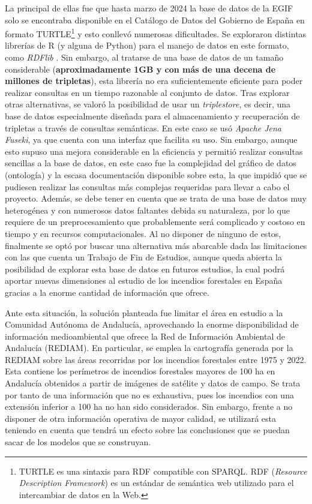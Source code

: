 \documentclass[12pt,a4paper,]{book}
\let\rmarkdownfootnote\footnote%
\def\footnote{\protect\rmarkdownfootnote}
\numberwithin{dummy}{section}
\theoremstyle{ocrenumbox}
\theoremstyle{blacknumex}
\theoremstyle{blacknumbox}
\theoremstyle{ocrenum}
\theoremstyle{ocrenum}
\begin{document}
La principal de ellas fue que hasta marzo de 2024 la base de datos de la
EGIF solo se encontraba disponible en el Catálogo de Datos del Gobierno
de España en formato TURTLE\footnote{TURTLE es una sintaxis para RDF
  compatible con SPARQL. RDF (\emph{Resource Description Framework}) es
  un estándar de semántica web utilizado para el intercambiar de datos
  en la Web.} y esto conllevó numerosas dificultades. Se exploraron
distintas librerías de R (y alguna de Python) para el manejo de datos en
este formato, como \emph{RDFlib} \citep{rdflib}. Sin embargo, al
tratarse de una base de datos de un tamaño considerable
(\textbf{aproximadamente 1GB y con más de una decena de millones de
tripletas}), esta librería no era suficientemente eficiente para poder
realizar consultas en un tiempo razonable al conjunto de datos. Tras
explorar otras alternativas, se valoró la posibilidad de usar un
\emph{triplestore}, es decir, una base de datos especialmente diseñada
para el almacenamiento y recuperación de tripletas a través de consultas
semánticas. En este caso se usó \emph{Apache Jena Fuseki}, ya que cuenta
con una interfaz que facilita su uso. Sin embargo, aunque esto supuso
una mejora considerable en la eficiencia y permitió realizar consultas
sencillas a la base de datos, en este caso fue la complejidad del
gráfico de datos (ontología) y la escasa documentación disponible sobre
esta, la que impidió que se pudiesen realizar las consultas más
complejas requeridas para llevar a cabo el proyecto. Además, se debe
tener en cuenta que se trata de una base de datos muy heterogénea y con
numerosos datos faltantes debida su naturaleza, por lo que requiere de
un preprocesamiento que probablemente será complicado y costoso en
tiempo y en recursos computacionales. Al no disponer de ninguno de
estos, finalmente se optó por buscar una alternativa más abarcable dada
las limitaciones con las que cuenta un Trabajo de Fin de Estudios,
aunque queda abierta la posibilidad de explorar esta base de datos en
futuros estudios, la cual podrá aportar nuevas dimensiones al estudio de
los incendios forestales en España gracias a la enorme cantidad de
información que ofrece.

Ante esta situación, la solución planteada fue limitar el área en
estudio a la Comunidad Autónoma de Andalucía, aprovechando la enorme
disponibilidad de información medioambiental que ofrece la Red de
Información Ambiental de Andalucía (REDIAM). En particular, se emplea la
cartografía generada por la REDIAM sobre las áreas recorridas por los
incendios forestales entre 1975 y 2022. Esta contiene los perímetros de
incendios forestales mayores de 100 ha en Andalucía obtenidos a partir
de imágenes de satélite y datos de campo. Se trata por tanto de una
información que no es exhaustiva, pues los incendios con una extensión
inferior a 100 ha no han sido considerados. Sin embargo, frente a no
disponer de otra información operativa de mayor calidad, se utilizará
esta teniendo en cuenta que tendrá un efecto sobre las conclusiones que
se puedan sacar de los modelos que se construyan.
\end{document}

